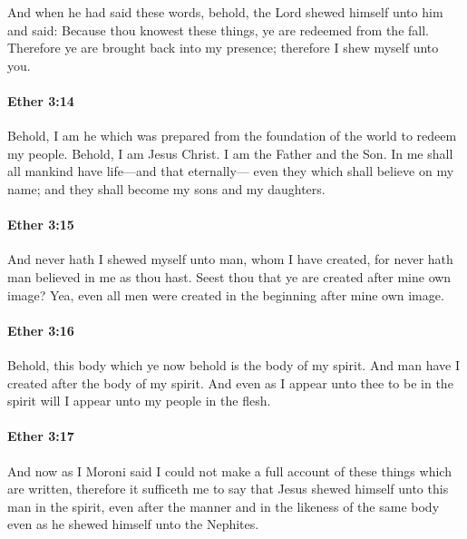 			And when he had said these words,
			behold, the Lord shewed himself unto him and said:
			Because thou knowest these things, ye are redeemed from the fall.
			Therefore ye are brought back into my presence;
			therefore I shew myself unto you.

		\paragraph{Ether 3:14} %
			\label{ETHER-3-14}

			Behold, I am he which was prepared
			from the foundation of the world
			to redeem my people.
			Behold, I am Jesus Christ.
			I am the Father and the Son.
			In me shall all mankind have life---and that eternally---
			even they which shall believe on my name;
			and they shall become my sons and my daughters.

		\paragraph{Ether 3:15} %
			\label{ETHER-3-15}

			And never hath I shewed myself unto man, whom I have created,
			for never hath man believed in me as thou hast.
			Seest thou that ye are created after mine own image?
			Yea, even all men were created in the beginning after mine own image.

		\paragraph{Ether 3:16} %
			\label{ETHER-3-16}

			Behold, this body which ye now behold is the body of my spirit.
			And man have I created after the body of my spirit.
			And even as I appear unto thee to be in the spirit
			will I appear unto my people in the flesh.

		\paragraph{Ether 3:17} %
			\label{ETHER-3-17}

			And now as I Moroni said
			I could not make a full account of these things which are written,
			therefore it sufficeth me to say
			that Jesus shewed himself unto this man in the spirit,
			even after the manner and in the likeness of the same body
			even as he shewed himself unto the Nephites.


